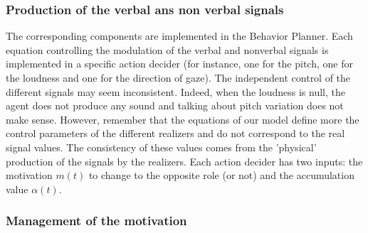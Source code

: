 
\subsubsection{Production of the verbal ans non verbal signals}

The corresponding components are implemented in the Behavior Planner. Each equation controlling the modulation of the verbal and nonverbal signals is implemented in a specific action decider (for instance, one for the pitch, one for the loudness and one for the direction of gaze). 
The independent control of the different signals may seem inconsistent. Indeed, when the loudness is null, the agent does not produce any sound and talking about pitch variation does not make sense. However, remember that the equations of our model define more the control parameters of the different realizers and do not correspond to the real signal values. The consistency of these values comes from the 'physical' production of the signals by the realizers.
Each action decider has two inputs: the motivation $m(t)$ to change to the opposite role (or not) and the accumulation value $\alpha(t)$. 


\subsubsection{Management of the motivation}

